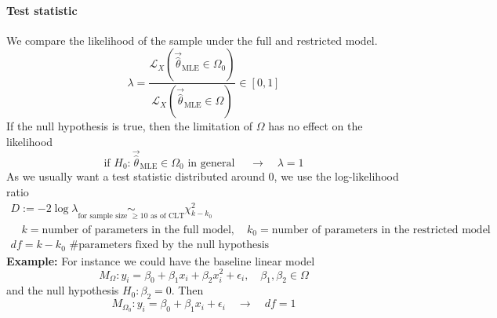 \paragraph*{Test statistic} We compare the likelihood of the sample under the full and restricted model.
\begin{equation}
    \lambda = \frac{\mathcal{L}_X(\vec{\hat{\theta}}_{\text{MLE}} \in \Omega_0)}{\mathcal{L}_X(\vec{\hat{\theta}}_{\text{MLE}} \in \Omega)} \in [0,1]
\end{equation}
If the null hypothesis is true, then the limitation of $\Omega$ has no effect on the likelihood
\begin{equation}
    \text{if } H_0: \vec{\hat{\theta}}_{\text{MLE}} \in \Omega_0 \text{ in general } \quad \rightarrow \quad \lambda = 1
\end{equation}
As we usually want a test statistic distributed around $0$, we use the log-likelihood ratio
\begin{equation}
    \begin{gathered}
        D := -2 \log{\lambda} \underset{\text{for sample size } \geq 10 \text{ as of CLT}}{\sim} \chi^2_{k-k_0} \\
        \quad k = \text{number of parameters in the full model}, \quad k_0 = \text{number of parameters in the restricted model} \\
        df = k - k_0 \text{ \# parameters fixed by the null hypothesis}
    \end{gathered}
\end{equation}
\textbf{Example:} For instance we could have the baseline linear model
\begin{equation}
    M_\Omega: y_i = \beta_0 + \beta_1 x_i + \beta_2 x_i^2 + \epsilon_i, \quad \beta_1, \beta_2 \in \Omega
\end{equation}
and the null hypothesis $H_0: \beta_2 = 0$. Then
\begin{equation}
    M_{\Omega_0}: y_i = \beta_0 + \beta_1 x_i + \epsilon_i \quad \rightarrow \quad df = 1
\end{equation}


